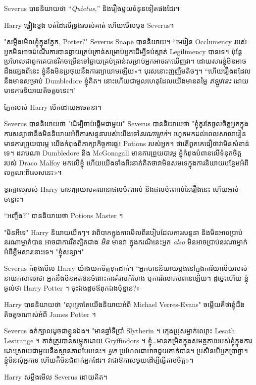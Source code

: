 {{{Severus បាននិយាយថា “\emph{Quietus,}” និងរឿងមួយចំនួនទៀតផងដែរ។

Harry ផ្អៀង​ខ្នង បត់​ដៃ​លើ​ទ្រូង​របស់​គាត់ ហើយ​មើល​មុខ Severus។

"សម្លឹងមើលខ្ញុំក្នុងភ្នែក, Potter?" Severus Snape បាននិយាយ។ “មេរៀន Occlumency របស់អ្នកមិនអាចដំណើរការបានឆ្ងាយគ្រប់គ្រាន់សម្រាប់អ្នកដើម្បីទប់ស្កាត់ Legilimency បានទេ។ ប៉ុន្តែ​ប្រហែល​ជា​ពួកគេ​បាន​រីកចម្រើន​ទៅ​ឆ្ងាយ​គ្រប់គ្រាន់​សម្រាប់​អ្នក​អាច​រក​ឃើញ​វា។ ដោយ​សារ​ខ្ញុំ​មិន​អាច​ដឹង​ផ្សេង​ពី​នេះ ខ្ញុំ​នឹង​មិន​ប្រថុយ​នឹង​ការ​ព្យាយាម​ឡើយ»។ បុរសនោះញញឹមតិចៗ។ “ហើយ​រឿង​ដដែល​នឹង​មាន​សម្រាប់ Dumbledore ខ្ញុំ​គិត។ នោះហើយជាមូលហេតុដែលយើងមានតម្លៃ \emph{ឥឡូវនេះ} ដោយមានការនិយាយតិចតួចនេះ។"

ភ្នែករបស់ Harry បើកដោយអចេតនា។

Severus បាននិយាយថា "ដើម្បីចាប់ផ្តើមជាមួយ" Severus បាននិយាយថា "ខ្ញុំគួរតែចូលចិត្តអ្នកក្នុងការសន្យាថានឹងមិននិយាយអំពីការសន្ទនារបស់យើងទៅ\emph{នរណាម្នាក់}។ រហូតមកដល់ពេលសាលារៀនមានការព្រួយបារម្ភ យើងកំពុងពិភាក្សាកិច្ចការផ្ទះ Potions របស់អ្នក។ ថាតើពួកគេជឿថាវាមិនសំខាន់ទេ។ ដរាបណា Dumbledore និង McGonagall មានការព្រួយបារម្ភ ខ្ញុំកំពុងបំពានលើទំនុកចិត្តរបស់ Draco Malfoy មកលើខ្ញុំ ហើយយើងទាំងពីរនាក់គិតថាវាមិនសមទេក្នុងការនិយាយបន្ថែមអំពីលក្ខណៈពិសេសនេះ»។

ខួរក្បាលរបស់ Harry បានព្យាយាមគណនាផលប៉ះពាល់ និងផលប៉ះពាល់នៃរឿងនេះ ហើយអស់ចន្លោះ។

“អញ្ចឹង?” បាននិយាយថា Potions Master ។

"មិនអីទេ" Harry និយាយយឺតៗ។ វាពិបាកក្នុងការមើលពីរបៀបដែលការសន្ទនា និងមិនអាចប្រាប់នរណាម្នាក់បាន អាចជាការរឹតត្បិតជាង \emph{មិន} មានវា ក្នុងករណីនេះអ្នក \emph{also} មិនអាចប្រាប់នរណាម្នាក់អំពីខ្លឹមសារនោះទេ។ "ខ្ញុំសន្យា។"

Severus កំពុងមើល Harry យ៉ាងយកចិត្តទុកដាក់។ “អ្នកបាននិយាយម្តងនៅក្នុងការិយាល័យរបស់នាយកសាលាថា អ្នកនឹងមិនអត់ឱនចំពោះការគំរាមកំហែង ឬការរំលោភបំពានឡើយ។ ដូច្នេះហើយ ខ្ញុំឆ្ងល់ថា Harry Potter ។ ចុះ​ឯង​ដូច​ឪពុក​ឯង​ប៉ុន្មាន?»

Harry បាននិយាយថា "លុះត្រាតែយើងនិយាយអំពី Michael Verres-Evans" ចម្លើយគឺថាខ្ញុំដឹងតិចតួចណាស់អំពី James Potter ។

Severus ងក់ក្បាលដូចជាខ្លួនឯង។ "មានឆ្នាំទីប្រាំ Slytherin ។ ក្មេងប្រុសម្នាក់ឈ្មោះ Lesath Lestrange ។ គាត់ត្រូវបានសម្លុតដោយ Gryffindors ។ ខ្ញុំ…មានកម្រិតក្នុងសមត្ថភាពរបស់ខ្ញុំក្នុងការដោះស្រាយជាមួយនឹងស្ថានភាពបែបនេះ។ \emph{អ្នក} ប្រហែលជាអាចជួយគាត់បាន។ ប្រសិនបើអ្នកប្រាថ្នា។ ខ្ញុំ​មិន​សុំ​អ្នក​ទេ ហើយ​ក៏​មិន​ជំពាក់​អ្នក​ដែរ។ វា​ជា​ឱកាស​មួយ​ដើម្បី​ធ្វើ​តាម​ចិត្ត​»។

Harry សម្លឹងមើល Severus ដោយគិត។

}}}
